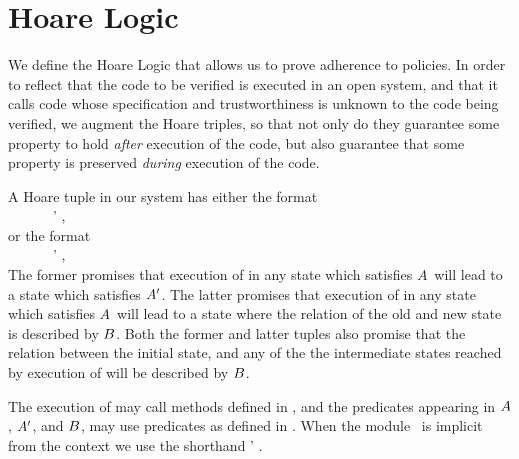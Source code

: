 \HoareFigOne  

\section{Hoare Logic}

We define the Hoare Logic that allows us to prove adherence to
policies. In order to reflect that the code to be verified is executed
in an open system, and that it calls code whose specification and
trustworthiness is unknown to the code being verified, we augment the
Hoare triples, so that not only do they guarantee some property to
hold {\em after} execution of the code, but also guarantee that some
property is preserved {\em during} execution of the
code.



A Hoare tuple in our system has either the format\\
$ ~ \ \ \ \ \ \ \ \  \ \ \ \  $   \HoareExpl{\A} {} {\M} {\A'} {\B},\\ 
 or the format\\
$ ~ \ \ \ \ \ \ \ \  \ \ \ \  $   \HoareExpl{\A} {} {\M} {\B'} {\B},\\  
The former promises that execution of  in any
state which satisfies $A$~will lead to a state which satisfies $A'$.
The latter promises that execution of  in any
state which satisfies $A$~will lead to a state where the relation of the old and new state is described by $B$.
Both the former and latter tuples also promise that
the relation between the initial state, and any of the 
the intermediate states reached by execution of   will be described by $B$. 

The execution of   may call methods defined in \M, and the
predicates appearing in $A$, $A'$, and $B$, may use  predicates
as defined in \M. 
 When the module \M\ is implicit from the context
 we use the shorthand
\Hoare{\A} {}  {\A'} {\B}. 



